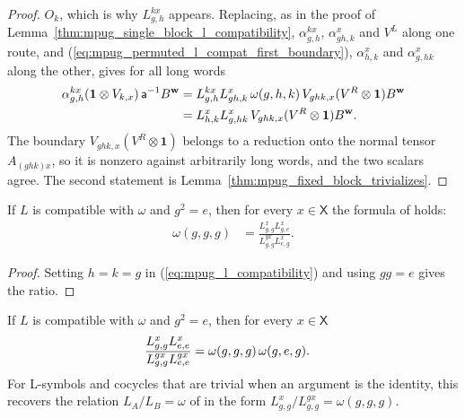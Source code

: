 \begin{proof}
    $O_k$, which is why $L^{kx}_{g,h}$ appears. Replacing, as in the proof of
    Lemma~\ref{thm:mpug_single_block_l_compatibility}, $\alpha^{kx}_{g,h}$,
    $\alpha^x_{gh,k}$ and $V^L$ along one route, and
    (\ref{eq:mpug_permuted_l_compat_first_boundary}), $\alpha^x_{h,k}$ and
    $\alpha^x_{g,hk}$ along the other, gives for all long words
    \begin{align}
        \alpha^{kx}_{g,h}(\mathbf 1\otimes V_{k,x})\,\mathsf a^{-1}B^{\mathbf w}
         & =L^{kx}_{g,h}L^x_{gh,k}\,\omega(g,h,k)\,
        V_{ghk,x}(V^R\otimes\mathbf 1)B^{\mathbf w}
        \notag                                                                \\
         & =L^x_{h,k}L^x_{g,hk}\,V_{ghk,x}(V^R\otimes\mathbf 1)B^{\mathbf w}.
        \notag
    \end{align}
    The boundary $V_{ghk,x}(V^R\otimes\mathbf 1)$ belongs to a reduction onto
    the normal tensor $A_{(ghk)x}$, so it is nonzero against arbitrarily long
    words, and the two scalars agree. The second statement is
    Lemma~\ref{thm:mpug_fixed_block_trivializes}.
\end{proof}

\begin{lemma}
    \label{thm:mpug_involution_anomaly_ratio}
    \leanok
    If $L$ is compatible with $\omega$ and $g^2=e$, then for every
    $x\in\mathsf X$ the formula of
    \cite[line~5121]{FrancoRubio2025MPUGauging} holds:
    \begin{align}
        \omega(g,g,g)
         & =\frac{L^x_{g,g}L^x_{g,e}}{L^{gx}_{g,g}L^x_{e,g}}.
    \end{align}
\end{lemma}

\begin{proof}\leanok
    Setting $h=k=g$ in (\ref{eq:mpug_l_compatibility}) and using $gg=e$
    gives the ratio.
\end{proof}

\begin{lemma}
    \label{thm:mpug_involution_anomaly_identity_ratio}
    \leanok
    If $L$ is compatible with $\omega$ and $g^2=e$, then for every
    $x\in\mathsf X$
    \begin{align}
        \frac{L^x_{g,g}L^x_{e,e}}{L^{gx}_{g,g}L^{gx}_{e,e}}
         & =\omega(g,g,g)\,\omega(g,e,g).
        \notag
    \end{align}
    For L-symbols and cocycles that are trivial when an argument is the
    identity, this recovers the relation $L_A/L_B=\omega$ of
    \cite[Section~III.C]{GarreRubioSchuch2024DomainWall} in the form
    $L^x_{g,g}/L^{gx}_{g,g}=\omega(g,g,g)$.
\end{lemma}

